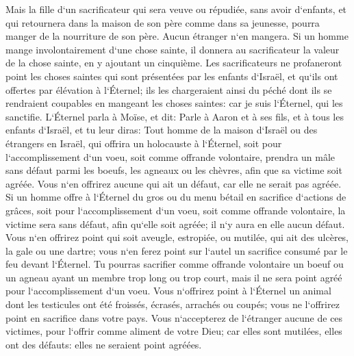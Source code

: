 \verse Mais la fille d`un sacrificateur qui sera veuve ou répudiée, sans avoir d`enfants, et qui retournera dans la maison de son père comme dans sa jeunesse, pourra manger de la nourriture de son père. Aucun étranger n`en mangera. 
\verse Si un homme mange involontairement d`une chose sainte, il donnera au sacrificateur la valeur de la chose sainte, en y ajoutant un cinquième. 
\verse Les sacrificateurs ne profaneront point les choses saintes qui sont présentées par les enfants d`Israël, et qu`ils ont offertes par élévation à l`Éternel; 
\verse ils les chargeraient ainsi du péché dont ils se rendraient coupables en mangeant les choses saintes: car je suis l`Éternel, qui les sanctifie. 
\verse L`Éternel parla à Moïse, et dit: 
\verse Parle à Aaron et à ses fils, et à tous les enfants d`Israël, et tu leur diras: Tout homme de la maison d`Israël ou des étrangers en Israël, qui offrira un holocauste à l`Éternel, soit pour l`accomplissement d`un voeu, soit comme offrande volontaire, 
\verse prendra un mâle sans défaut parmi les boeufs, les agneaux ou les chèvres, afin que sa victime soit agréée. 
\verse Vous n`en offrirez aucune qui ait un défaut, car elle ne serait pas agréée. 
\verse Si un homme offre à l`Éternel du gros ou du menu bétail en sacrifice d`actions de grâces, soit pour l`accomplissement d`un voeu, soit comme offrande volontaire, la victime sera sans défaut, afin qu`elle soit agréée; il n`y aura en elle aucun défaut. 
\verse Vous n`en offrirez point qui soit aveugle, estropiée, ou mutilée, qui ait des ulcères, la gale ou une dartre; vous n`en ferez point sur l`autel un sacrifice consumé par le feu devant l`Éternel. 
\verse Tu pourras sacrifier comme offrande volontaire un boeuf ou un agneau ayant un membre trop long ou trop court, mais il ne sera point agréé pour l`accomplissement d`un voeu. 
\verse Vous n`offrirez point à l`Éternel un animal dont les testicules ont été froissés, écrasés, arrachés ou coupés; vous ne l`offrirez point en sacrifice dans votre pays. 
\verse Vous n`accepterez de l`étranger aucune de ces victimes, pour l`offrir comme aliment de votre Dieu; car elles sont mutilées, elles ont des défauts: elles ne seraient point agréées. 
